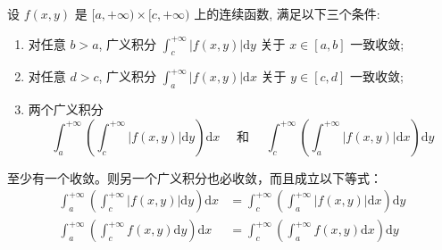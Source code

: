 \begin{theorem}[定理 18.2.8]
    设 $f(x, y)$ 是 $[a,+\infty) \times[c,+\infty)$ 上的连续函数, 满足以下三个条件:
    \begin{enumerate}
        \item 对任意 $b>a$, 广义积分 $\int_c^{+\infty}|f(x, y)| \mathrm{d} y$ 关于 $x \in[a, b]$ 一致收敛;
        \item 对任意 $d>c$, 广义积分 $\int_a^{+\infty}|f(x, y)| \mathrm{d} x$ 关于 $y \in[c, d]$ 一致收敛;
        \item 两个广义积分
        \[
        \int_a^{+\infty}\left(\int_c^{+\infty}|f(x, y)| \mathrm{d} y\right) \mathrm{d} x \quad \text { 和 } \quad \int_c^{+\infty}\left(\int_a^{+\infty}|f(x, y)| \mathrm{d} x\right) \mathrm{d} y
        \]
    \end{enumerate}
    至少有一个收敛。则另一个广义积分也必收敛，而且成立以下等式：
    \[
    \begin{aligned}
    \int_a^{+\infty}\left(\int_c^{+\infty}|f(x, y)| \mathrm{d} y\right) \mathrm{d} x & =\int_c^{+\infty}\left(\int_a^{+\infty}|f(x, y)| \mathrm{d} x\right) \mathrm{d} y \\
    \int_a^{+\infty}\left(\int_c^{+\infty} f(x, y) \mathrm{d} y\right) \mathrm{d} x & =\int_c^{+\infty}\left(\int_a^{+\infty} f(x, y) \mathrm{d} x\right) \mathrm{d} y
    \end{aligned}
    \]
\end{theorem}

